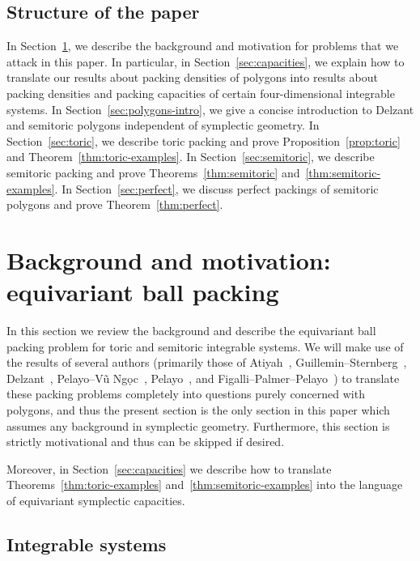 \documentclass[pdftex]{sigma}
\numberwithin{equation}{section}
\begin{document}
\subsection{Structure of the paper}
In Section~\ref{sec:symplectic-background}, we describe the background and motivation for problems that we attack in this paper.
In particular, in Section~\ref{sec:capacities}, we explain how to translate our results about packing densities of polygons into results about packing densities and packing capacities of certain four-dimensional integrable systems.
In Section~\ref{sec:polygons-intro}, we give a concise introduction to Delzant and semitoric polygons independent of symplectic geometry.
In Section~\ref{sec:toric}, we describe toric packing and prove Proposition~\ref{prop:toric} and Theorem~\ref{thm:toric-examples}.
In Section~\ref{sec:semitoric}, we describe semitoric packing and prove Theorems~\ref{thm:semitoric} and~\ref{thm:semitoric-examples}.
In Section~\ref{sec:perfect}, we discuss perfect packings of semitoric polygons and prove Theorem~\ref{thm:perfect}.



\section{Background and motivation: equivariant ball packing}
\label{sec:symplectic-background}

In this section we review the background and describe the equivariant ball packing problem for toric and semitoric integrable systems.
We will make use of the results of several authors (primarily those of Atiyah~\cite{Atiyah}, Guillemin--Sternberg~\cite{GuSt1982}, Delzant~\cite{De1988}, Pelayo--V\~{u} Ng\d{o}c~\cite{PeVN2009,PeVN2011}, Pelayo~\cite{Pe2006,Pe2007}, and Figalli--Palmer--Pelayo~\cite{FiPaPe2016}) to translate these packing problems completely into questions purely concerned with polygons, and thus the present section is the only section in this paper which assumes any background in symplectic geometry.
Furthermore, this section is strictly motivational and thus can be skipped if desired.

Moreover, in Section~\ref{sec:capacities} we describe how to translate Theorems~\ref{thm:toric-examples} and~\ref{thm:semitoric-examples} into the language of equivariant symplectic capacities.



\subsection{Integrable systems}
\end{document}

